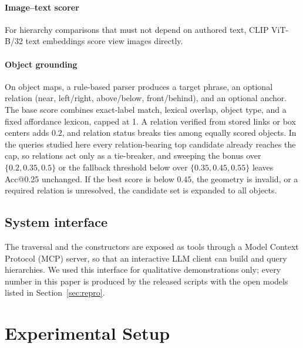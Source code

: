 \documentclass{ieeeaccess}
\begin{document}
\paragraph{Image--text scorer}
For hierarchy comparisons that must not depend on authored text, CLIP ViT-B/32
text embeddings score view images directly.

\paragraph{Object grounding}
On object maps, a rule-based parser produces a target phrase, an optional
relation (near, left/right, above/below, front/behind), and an optional anchor.
The base score combines exact-label match, lexical overlap, object type, and a
fixed affordance lexicon, capped at 1. A relation verified from stored links or
box centers adds $0.2$, and relation status breaks ties among equally scored
objects. In the queries studied here every relation-bearing top candidate already
reaches the cap, so relations act only as a tie-breaker, and sweeping the bonus
over $\{0.2,0.35,0.5\}$ or the fallback threshold below over $\{0.35,0.45,0.55\}$
leaves Acc@0.25 unchanged. If the best score is below $0.45$, the geometry is
invalid, or a required relation is unresolved, the candidate set is expanded to
all objects.

\subsection{System interface}
The traversal and the constructors are exposed as tools through a Model Context
Protocol (MCP) server, so that an interactive LLM client can build and query
hierarchies. We used this interface for qualitative demonstrations only; every
number in this paper is produced by the released scripts with the open models
listed in Section~\ref{sec:repro}.

\section{Experimental Setup}
\label{sec:setup}
\end{document}
